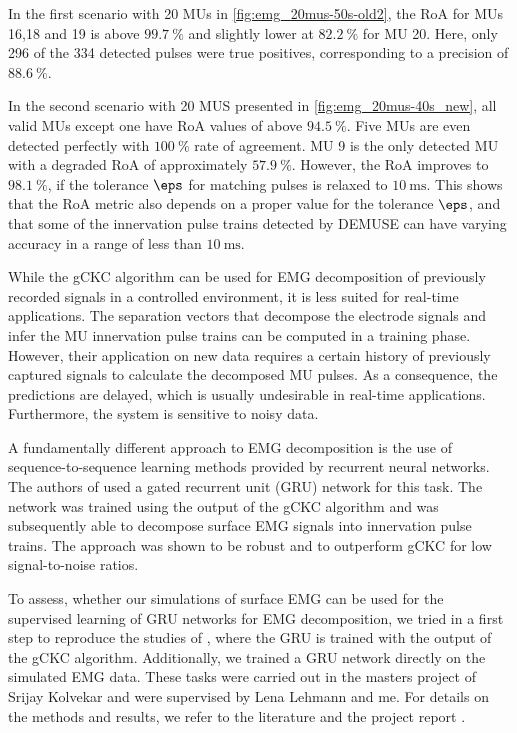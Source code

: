 In the first scenario with 20 MUs in \cref{fig:emg_20mus-50s-old2}, the RoA for MUs 16,18 and 19 is above $\SI{99.7}{\percent}$ and slightly lower at $\SI{82.2}{\percent}$ for MU 20. Here, only 296 of the 334 detected pulses were true positives, corresponding to a precision of $\SI{88.6}{\percent}$.
 
In the second scenario with 20 MUS presented in \cref{fig:emg_20mus-40s_new}, all valid MUs except one have RoA values of above $\SI{94.5}{\percent}$. Five MUs are even detected perfectly with $\SI{100}{\percent}$ rate of agreement. MU 9 is the only detected MU with a degraded RoA of approximately $\SI{57.9}{\percent}$. However, the RoA improves to $\SI{98.1}{\percent}$, if the tolerance $\eps$ for matching pulses is relaxed to $\SI{10}{\ms}$. This shows that the RoA metric also depends on a proper value for the tolerance $\eps$, and that some of the innervation pulse trains detected by DEMUSE can have varying accuracy in a range of less than $\SI{10}{\ms}$.
 
 
While the gCKC algorithm can be used for EMG decomposition of previously recorded signals in a controlled environment, it is less suited for real-time applications. The separation vectors that decompose the electrode signals and infer the MU innervation pulse trains can be computed in a training phase. 
However, their application on new data requires a certain history of previously captured signals to calculate the decomposed MU pulses. As a consequence, the predictions are delayed, which is usually undesirable in real-time applications. Furthermore, the system is sensitive to noisy data. 

A fundamentally different approach to EMG decomposition is the use of sequence-to-sequence learning methods provided by recurrent neural networks. The authors of \cite{Clarke2021} used a gated recurrent unit (GRU) network for this task. The network was trained using the output of the gCKC algorithm and was subsequently able to decompose surface EMG signals into innervation pulse trains. The approach was shown to be robust and to outperform gCKC for low signal-to-noise ratios.

To assess, whether our simulations of surface EMG can be used for the supervised learning of GRU networks for EMG decomposition, we tried in a first step to reproduce the studies of \cite{Clarke2021}, where the GRU is trained with the output of the gCKC algorithm. Additionally, we trained a GRU network directly on the simulated EMG data. These tasks were carried out in the masters project of Srijay Kolvekar and were supervised by Lena Lehmann and me. For details on the methods and results, we refer to the literature \cite{Clarke2021} and the project report \cite{Srijay}.

